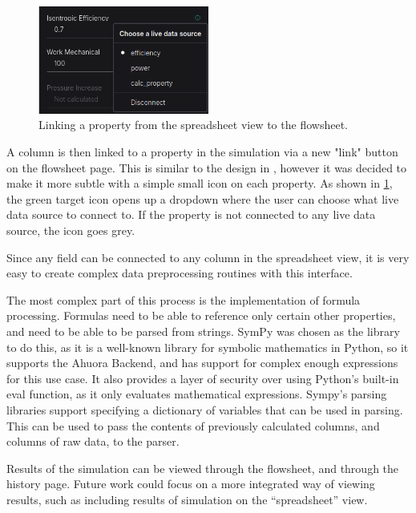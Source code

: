 \begin{figure}[h]
    \centering
    \includegraphics[width=0.5\textwidth]{link_property.png}
    \caption{Linking a property from the spreadsheet view to the flowsheet.}
    \label{fig:linkproperty}
\end{figure}

A column is then linked to a property in the simulation via a new "link" button on the flowsheet page. This is similar to the design in , however it was decided to make it more subtle with a simple small icon on each property. As shown in \cref{fig:linkproperty}, the green target icon opens up a dropdown where the user can choose what live data source to connect to. If the property is not connected to any live data source, the icon goes grey.

Since any field can be connected to any column in the spreadsheet view, it is very easy to create complex data preprocessing routines with this interface.




The most complex part of this process is the implementation of formula processing. Formulas need to be able to reference only certain other properties, and need to be able to be parsed from strings. SymPy was chosen as the library to do this, as it is a well-known library for symbolic mathematics in Python, so it supports the Ahuora Backend, and has support for complex enough expressions for this use case. It also provides a layer of security over using Python's built-in eval function, as it only evaluates mathematical expressions.
Sympy's parsing libraries support specifying a dictionary of variables that can be used in parsing. This can be used to pass the contents of previously calculated columns, and columns of raw data, to the parser. 

Results of the simulation can be viewed through the flowsheet, and through the history page. Future work could focus on a more integrated way of viewing results, such as including results of simulation on the ``spreadsheet'' view.



